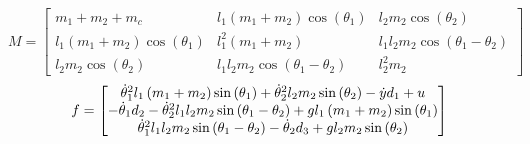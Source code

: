 \begin{equation}
M = \left[\begin{matrix}m_{1} + m_{2} + m_{c} & l_{1} \left(m_{1} + m_{2}\right) \cos{\left(\theta_{1} \right)} & l_{2} m_{2} \cos{\left(\theta_{2} \right)}\\
l_{1} \left(m_{1} + m_{2}\right) \cos{\left(\theta_{1} \right)} & l_{1}^{2} \left(m_{1} + m_{2}\right) & l_{1} l_{2} m_{2} \cos{\left(\theta_{1} - \theta_{2} \right)}\\
l_{2} m_{2} \cos{\left(\theta_{2} \right)} & l_{1} l_{2} m_{2} \cos{\left(\theta_{1} - \theta_{2} \right)} & l_{2}^{2} m_{2}\end{matrix}\right]
\end{equation}
\begin{equation}
f = \left[\begin{matrix}\dot\theta_{1}^{2} l_{1} \left(m_{1} + m_{2}\right) \sin{\left(\theta_{1} \right)} + \dot\theta_{2}^{2} l_{2} m_{2} \sin{\left(\theta_{2} \right)} - \dot y d_{1} + u\\
- \dot\theta_{1} d_{2} - \dot\theta_{2}^{2} l_{1} l_{2} m_{2} \sin{\left(\theta_{1} - \theta_{2} \right)} + g l_{1} \left(m_{1} + m_{2}\right) \sin{\left(\theta_{1} \right)}\\
\dot\theta_{1}^{2} l_{1} l_{2} m_{2} \sin{\left(\theta_{1} - \theta_{2} \right)} - \dot\theta_{2} d_{3} + g l_{2} m_{2} \sin{\left(\theta_{2} \right)}\end{matrix}\right]
\end{equation}
